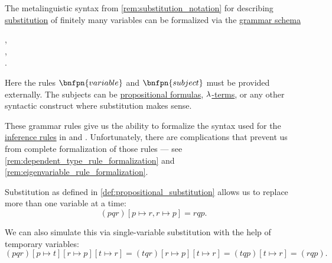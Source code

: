 \begin{definition}\label{def:substitution_schema}
  The metalinguistic syntax from \cref{rem:substitution_notation} for describing \hyperref[con:syntactic_substitution]{substitution} of finitely many variables can be formalized via the \hyperref[def:formal_grammar/schema]{grammar schema}
  \begin{bnf*}
          { \bnfsp \bnftsq{\( \synsubst \)} \bnfsp {}}, \\
     { \bnfor {} \bnfsp \bnftsq{,} \bnfsp {}}, \\
         { \bnfsp \bnftsq{\( [ \)} \bnfsp {} \bnfsp \bnftsq{\( ] \)}}.
  \end{bnf*}

  Here the rules \( \bnfpn{variable} \) and \( \bnfpn{subject} \) must be provided externally. The subjects can be \hyperref[def:propositional_syntax/formula]{propositional formulas}, \hyperref[def:lambda_term]{\( {\mathrm \lambda} \)-terms}, or any other syntactic construct where substitution makes sense.
\end{definition}
\begin{comments}
  \item These grammar rules give us the ability to formalize the syntax used for the \hyperref[def:inference_rule]{inference rules} in  and . Unfortunately, there are complications that prevent us from complete formalization of those rules --- see \cref{rem:dependent_type_rule_formalization} and \cref{rem:eigenvariable_rule_formalization}.
\end{comments}

\begin{remark}\label{rem:simulating_simultaneous_substitution}
  Substitution as defined in \cref{def:propositional_substitution} allows us to replace more than one variable at a time:
  \begin{equation*}
    (pqr)[p \mapsto r, r \mapsto p]
    =
    rqp.
  \end{equation*}

  We can also simulate this via single-variable substitution with the help of temporary variables:
  \begin{equation*}
    (pqr)[p \mapsto t][r \mapsto p][t \mapsto r]
    =
    (tqr)[r \mapsto p][t \mapsto r]
    =
    (tqp)[t \mapsto r]
    =
    (rqp).
  \end{equation*}
\end{remark}

